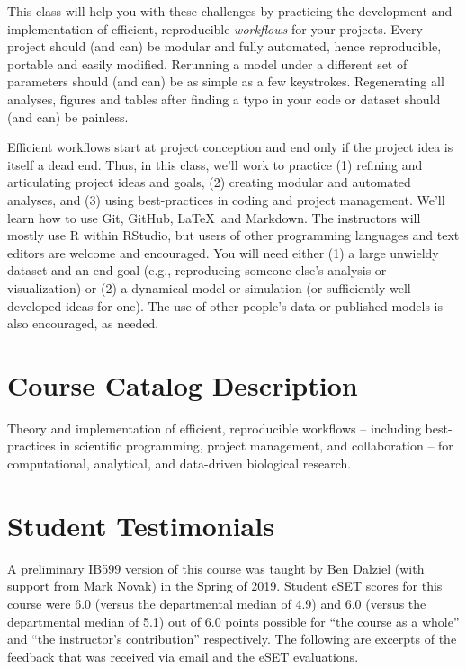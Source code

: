 \documentclass[10pt]{article}
\begin{document}
This class will help you with these challenges by practicing the development and implementation of efficient, reproducible \emph{workflows} for your projects.  Every project should (and can) be modular and fully automated, hence reproducible, portable and easily modified.  Rerunning a model under a different set of parameters should (and can) be as simple as a few keystrokes. Regenerating all analyses, figures and tables after finding a typo in your code or dataset should (and can) be painless.

Efficient workflows start at project conception and end only if the project idea is itself a dead end.  Thus, in this class, we'll work to practice (1) refining and articulating project ideas and goals, (2) creating modular and automated analyses, and (3) using best-practices in coding and project management. We'll learn how to use Git, GitHub, \LaTeX\, and Markdown.  The instructors will mostly use \textsf{R} within RStudio, but users of other programming languages and text editors are welcome and encouraged.  You will need either (1) a large unwieldy dataset and an end goal (e.g., reproducing someone else's analysis or visualization) or (2) a dynamical model or simulation (or sufficiently well-developed ideas for one).  The use of other people's data or published models is also encouraged, as needed.

\section*{Course Catalog Description}
Theory and implementation of efficient, reproducible workflows -- including best-practices in scientific programming, project management, and collaboration --  for computational, analytical, and data-driven biological research.

\section*{Student Testimonials}
A preliminary IB599 version of this course was taught by Ben Dalziel (with support from Mark Novak) in the Spring of 2019.  Student eSET scores for this course were 6.0 (versus the departmental median of 4.9) and 6.0 (versus the departmental median of 5.1) out of 6.0 points possible for ``the course as a whole'' and ``the instructor's contribution'' respectively. The following are excerpts of the feedback that was received via email and the eSET evaluations.
\end{document}
